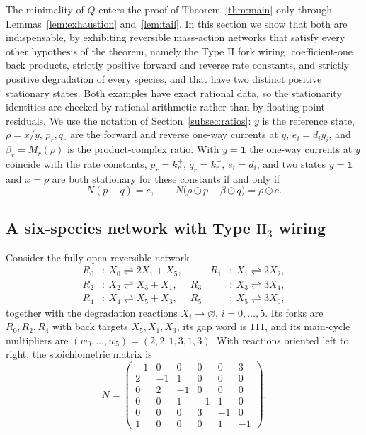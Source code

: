 \documentclass[11pt,reqno]{amsart}
\theoremstyle{plain}
\theoremstyle{definition}
\theoremstyle{remark}
\numberwithin{equation}{section}
\newcommand{\one}{\mathbf{1}}
\begin{document}
The minimality of $Q$ enters the proof of Theorem~\ref{thm:main} only through Lemmas~\ref{lem:exhaustion} and~\ref{lem:tail}.  In this section we show that both are indispensable, by exhibiting reversible mass-action networks that satisfy every other hypothesis of the theorem, namely the Type II fork wiring, coefficient-one back products, strictly positive forward and reverse rate constants, and strictly positive degradation of every species, and that have two distinct positive stationary states.  Both examples have exact rational data, so the stationarity identities are checked by rational arithmetic rather than by floating-point residuals.  We use the notation of Section~\ref{subsec:ratios}: $y$ is the reference state, $\rho=x/y$, $p_r,q_r$ are the forward and reverse one-way currents at $y$, $e_i=d_iy_i$, and $\beta_r=M_r(\rho)$ is the product-complex ratio.  With $y=\one$ the one-way currents at $y$ coincide with the rate constants, $p_r=k_r^+$, $q_r=k_r^-$, $e_i=d_i$, and two states $y=\one$ and $x=\rho$ are both stationary for these constants if and only if
\begin{equation}\label{eq:two-root}
N(p-q)=e,\qquad N\bigl(\rho\odot p-\beta\odot q\bigr)=\rho\odot e .
\end{equation}

\subsection{A six-species network with Type $\mathrm{II}_3$ wiring}\label{subsec:six}
Consider the fully open reversible network
\begin{equation}\label{eq:six-network}
\begin{aligned}
R_0&:\ X_0\rightleftharpoons 2X_1+X_5, &\qquad R_1&:\ X_1\rightleftharpoons 2X_2, \\
R_2&:\ X_2\rightleftharpoons X_3+X_1, & R_3&:\ X_3\rightleftharpoons 3X_4, \\
R_4&:\ X_4\rightleftharpoons X_5+X_3, & R_5&:\ X_5\rightleftharpoons 3X_0,
\end{aligned}
\end{equation}
together with the degradation reactions $X_i\to\varnothing$, $i=0,\dots,5$.  Its forks are $R_0,R_2,R_4$ with back targets $X_5,X_1,X_3$, its gap word is $111$, and its main-cycle multipliers are $(w_0,\dots,w_5)=(2,2,1,3,1,3)$.  With reactions oriented left to right, the stoichiometric matrix is
\begin{equation}\label{eq:six-N}
N=\begin{pmatrix}
-1&0&0&0&0&3\\
2&-1&1&0&0&0\\
0&2&-1&0&0&0\\
0&0&1&-1&1&0\\
0&0&0&3&-1&0\\
1&0&0&0&1&-1
\end{pmatrix}.
\end{equation}
\end{document}
